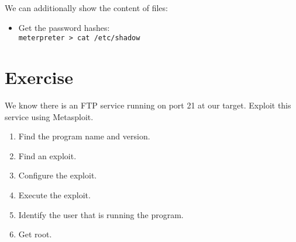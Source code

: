 We can additionally show the content of files: 

\begin{itemize}
    \item Get the password hashes:\\
    \texttt{meterpreter > cat /etc/shadow}
\end{itemize}

\section{Exercise}

We know there is an FTP service running on port 21 at our target. Exploit this service using Metasploit.

\begin{enumerate}
    \item Find the program name and version.
    \item Find an exploit.
    \item Configure the exploit.
    \item Execute the exploit.
    \item Identify the user that is running the program.
    \item Get root.
\end{enumerate}